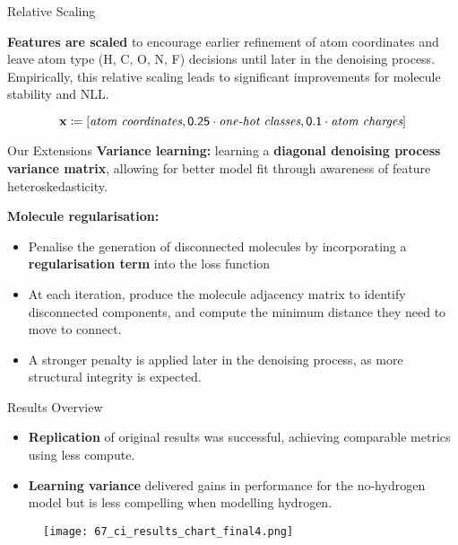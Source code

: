 \documentclass[final]{beamer}
\newlength{\colwidth}
\begin{document}
\begin{frame}[t]
\begin{columns}[t]
\begin{column}{\colwidth}
      \begin{block}{Relative Scaling}

        \textbf{Features are scaled} to encourage earlier refinement of atom coordinates and leave atom type (H, C, O, N, F) decisions until later in the denoising process. Empirically, this relative scaling leads to significant improvements for molecule stability and NLL.

        \[
          \vb{x} \coloneqq [\textit{atom coordinates}, \mathsf{0.25} \cdot \textit{one-hot classes}, \mathsf{0.1} \cdot \textit{atom charges}]
        \]

      \end{block}

      \begin{exampleblock}{Our Extensions}
        \textbf{Variance learning:} learning a \textbf{diagonal denoising process variance matrix}, allowing for better model fit through awareness of feature heteroskedasticity.

        \textbf{Molecule regularisation:}
        \begin{itemize}
          \item  Penalise the generation of disconnected molecules by incorporating a \textbf{regularisation term} into the loss function
          \item At each iteration, produce the molecule adjacency matrix to identify disconnected components, and compute the minimum distance they need to move to connect.
          \item A stronger penalty is applied later in the denoising process, as more structural integrity is expected.
        \end{itemize}

      \end{exampleblock}{}

      \begin{block}{Results Overview}

        \begin{itemize}
          \item \textbf{Replication} of original results was successful, achieving comparable metrics using less compute.
          \item \textbf{Learning variance} delivered gains in performance for the no-hydrogen model but is less compelling when modelling hydrogen.
        \end{itemize}

        \begin{figure}[h]
          \centering
          \begin{minipage}[c]{1\linewidth}
            \centering
            \texttt{[image: 67\_ci\_results\_chart\_final4.png]}
          \end{minipage}
        \end{figure}


\end{block}
\end{column}
\end{columns}
\end{frame}
\end{document}
